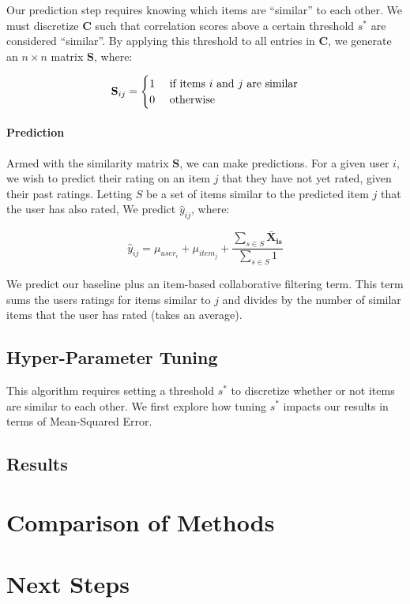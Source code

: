 \documentclass[12pt]{article}
\begin{document}
Our prediction step requires knowing which items are ``similar'' to each other. We must discretize $\mathbf{C}$ such that correlation scores above a certain threshold $s^*$ are considered ``similar''. By applying this threshold to all entries in $\mathbf{C}$, we generate an $n \times n$ matrix $\mathbf{S}$, where:

$$
\mathbf{S}_{ij} =
\begin{cases}
    \hfill 1    \hfill & \text{ if items $i$ and $j$ are similar} \\
    \hfill 0    \hfill & \text{ otherwise} \\
\end{cases}
$$

\paragraph{Prediction} Armed with the similarity matrix $\mathbf{S}$, we can make predictions. For a given user $i$, we wish to predict their rating on an item $j$ that they have not yet rated, given their past ratings. Letting $S$ be a set of items similar to the predicted item $j$ that the user has also rated, We predict $\hat y_{ij}$, where:

$$ \hat y_{ij} = \mu_{user_i} + \mu_{item_j} + \frac{\sum_{s \in S} \mathbf{\bar X_{is}}}{\sum_{s \in S} 1 }$$

We predict our baseline plus an item-based collaborative filtering term. This term sums the users ratings for items similar to $j$ and divides by the number of similar items that the user has rated (takes an average).

\subsection{Hyper-Parameter Tuning}
This algorithm requires setting a threshold $s^*$ to discretize whether or not items are similar to each other. We first explore how tuning $s^*$ impacts our results in terms of Mean-Squared Error.

\subsection{Results}

\section{Comparison of Methods}

\section{Next Steps}
\end{document}

